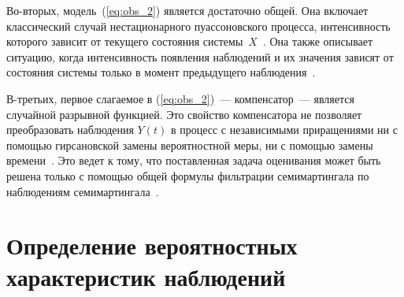 \begin{multicols}{2}
 Во-вторых, модель~(\ref{eq:obs_2}) является достаточно общей.
 Она включает классический случай нестационарного пуассоновского процесса,
 интенсивность которого зависит от текущего состояния систе\-мы~$X$~\cite{WongH_85}.
 Она также описывает ситуацию, когда интенсивность появления наблюдений и их значения
 зависят от состояния системы только в момент предыдущего наблюдения~\cite{bms_14}.

  В-третьих, первое слагаемое в (\ref{eq:obs_2})~--- компенсатор~---
  является случайной разрывной функцией. Это свойство компенсатора не
  позволяет преобразовать наблюдения $Y(t)$ в процесс с независимыми
  приращениями ни с помощью гирсановской замены вероятностной меры, ни
  с по\-мощью замены времени~\cite{JSh_94}.
Это ведет к тому, что поставленная задача оценивания может быть решена
только с помощью общей формулы фильтрации семимартингала по наблюдениям
семимартингала~\cite{LS_86}.

 \section{Определение вероятностных характеристик наблюдений}


\end{multicols}
